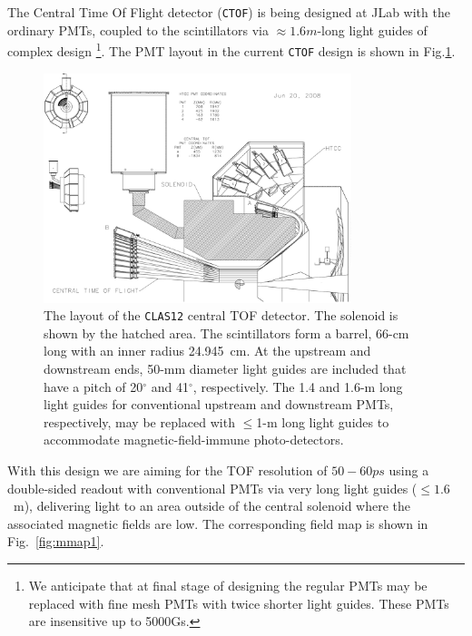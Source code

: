 \documentclass[12pt]{article}
\begin{document}
The Central Time Of Flight detector ({\tt CTOF})
 is being designed at JLab with the  ordinary PMTs, coupled
to the scintillators via $\approx1.6m$-long light guides of complex design
\footnote{We  anticipate that  at
final stage of designing   the regular PMTs may be replaced
with fine mesh PMTs with twice shorter light guides. These PMTs
 are insensitive  up to 5000Gs.}.
The PMT layout in the current  {\tt CTOF} design  
is shown in 
Fig.{\ref{barrel2}}.



\begin{figure}[htbp]
\centering
\includegraphics[width=0.8\textwidth]{HTCC_CTOF_STUDY_060507_WRAP.eps}
\caption{\small{The layout of the {\tt CLAS12} central TOF detector.
The solenoid is shown by the hatched area.  The scintillators form a barrel,
66-cm long with an inner radius 24.945~cm.  At the upstream and downstream
ends, 50-mm diameter light guides are included that have a pitch of
20$^\circ$ and 41$^\circ$, respectively.  The 1.4 and  1.6-m long light guides
for conventional upstream and downstream PMTs,  respectively,
may be replaced with $\leq$1-m long light guides to accommodate magnetic-field-immune photo-detectors.}}
\label{barrel2}
\end{figure}
With this design  we
are aiming for the TOF resolution of $50-60ps$ using a double-sided readout
with conventional PMTs via very  long light guides ($\leq 1.6$~m), delivering
light to an area outside of the central solenoid where the associated
magnetic fields are low. The corresponding field map is shown in  Fig.~\ref{fig:mmap1}.
\end{document}
